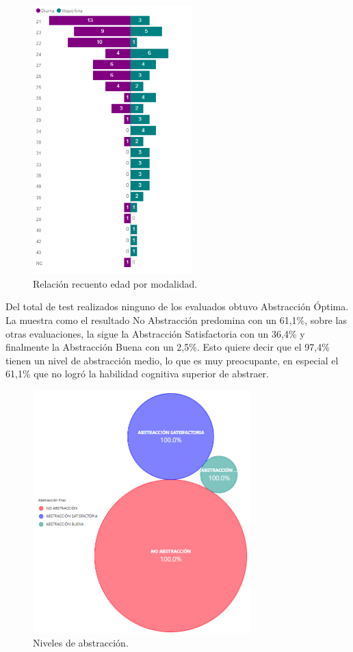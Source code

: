 \documentclass[spanish]{textolivre}
\begin{document}
\begin{figure}[htbp]
 \centering
 \includegraphics[width=0.55\textwidth]{figura1.png}
 \caption{Relación recuento edad por modalidad.}
 \label{figura 1}
\end{figure}

Del total de test realizados ninguno de los evaluados obtuvo Abstracción Óptima. La  muestra como el resultado No Abstracción predomina con un 61,1\%, sobre las otras evaluaciones, la sigue la Abstracción Satisfactoria con un 36,4\% y finalmente la Abstracción Buena con un 2,5\%. Esto quiere decir que el 97,4\% tienen un nivel de abstracción medio, lo que es muy preocupante, en especial el 61,1\% que no logró la habilidad cognitiva superior de abstraer.

\begin{figure}[htbp]
 \centering
 \includegraphics[width=0.75\textwidth]{figura2.png}
 \caption{Niveles de abstracción.}
 \label{figura 2}
\end{figure}
\end{document}
